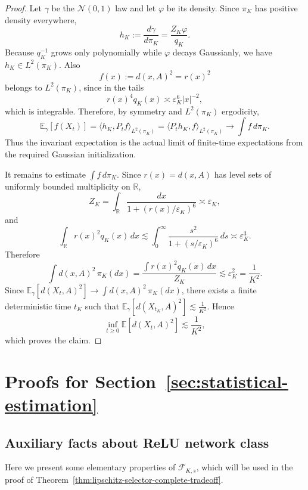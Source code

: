 \documentclass{article}
\newcommand{\1}{\mathbbm{1}}
\newcommand{\E}{\mathbb E}
\renewcommand{\H}{\mathcal{H}}
\numberwithin{equation}{section}
\def\to{\rightarrow}
\def\E{{\bf E}} \def\H{{\bf H}} \def\J{{\bf J}}
\def\E{\mathbb{E}}
\begin{document}
\begin{proof}
Let $\gamma$ be the $\mathcal N(0,1)$ law and let $\varphi$ be its density. Since $\pi_K$ has positive density everywhere,
$$
h_K:=\frac{d\gamma}{d\pi_K}
=
\frac{Z_K\varphi}{q_K}.
$$
Because $q_K^{-1}$ grows only polynomially while $\varphi$ decays Gaussianly, we have $h_K\in L^2(\pi_K)$. Also
$$
f(x):=d(x,A)^2=r(x)^2
$$
belongs to $L^2(\pi_K)$, since in the tails
$$
r(x)^4q_K(x)\asymp \varepsilon_K^6 |x|^{-2},
$$
which is integrable. Therefore, by symmetry and $L^2(\pi_K)$ ergodicity,
$$
\E_{\gamma}[f(X_t)]
=
\langle h_K,P_tf\rangle_{L^2(\pi_K)}
=
\langle P_th_K,f\rangle_{L^2(\pi_K)}
\to
\int f\,d\pi_K.
$$
Thus the invariant expectation is the actual limit of finite-time expectations from the required Gaussian initialization.

It remains to estimate $\int f\,d\pi_K$. Since $r(x)=d(x,A)$ has level sets of uniformly bounded multiplicity on $\mathbb R$,
$$
Z_K
=
\int_{\mathbb R}\frac{dx}{1+(r(x)/\varepsilon_K)^6}
\asymp
\varepsilon_K,
$$
and
$$
\int_{\mathbb R}r(x)^2q_K(x)\,dx
\lesssim
\int_0^\infty \frac{s^2}{1+(s/\varepsilon_K)^6}\,ds
\asymp
\varepsilon_K^3.
$$
Therefore
$$
\int d(x,A)^2\,\pi_K(dx)
=
\frac{\int r(x)^2q_K(x)\,dx}{Z_K}
\lesssim
\varepsilon_K^2
=
\frac1{K^2}.
$$
Since $\E_{\gamma}[d(X_t,A)^2]\to \int d(x,A)^2\,\pi_K(dx)$, there exists a finite deterministic time $t_K$ such that $\E_{\gamma}[d(X_{t_K},A)^2]\lesssim \frac1{K^2}$.
Hence
$$
\inf_{t\ge 0}\E[d(X_t,A)^2]\lesssim \frac1{K^2},
$$
which proves the claim.
\end{proof}





\section{Proofs for Section~\ref{sec:statistical-estimation}}
\label{app:statistical-generalization}




\subsection{Auxiliary  facts about ReLU network class}
\label{app:relu}


Here we present some  elementary properties  of  \(\mathcal F_{K,s}\), which will be   used in the proof of Theorem~\ref{thm:lipschitz-selector-complete-tradeoff}.
\end{document}
